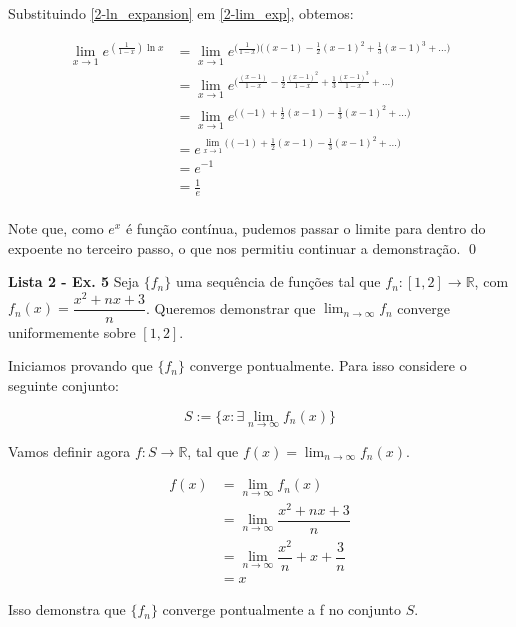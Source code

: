 \documentclass[12.5pt,reqno,a4paper]{amsart}
\begin{document}
\newpage
Substituindo \eqref{2-ln_expansion} em \eqref{2-lim_exp}, obtemos:

\begin{align*}
    \lim_{x \to 1} e^{(\tfrac{1}{1 - x}) \ln{x}} &= \lim_{x \to 1} e^{\big(\tfrac{1}{1 - x}\big) \big((x-1) - \tfrac{1}{2}(x-1)^2 + \tfrac{1}{3}(x-1)^3 + ...\big)}\\
        &= \lim_{x \to 1} e^{\big(\tfrac{(x-1)}{1-x} - \tfrac{1}{2}\tfrac{(x-1)^2}{1-x} + \tfrac{1}{3}\tfrac{(x-1)^3}{1-x} + ...\big)}\\
        &= \lim_{x \to 1} e^{\big((-1) + \tfrac{1}{2}(x-1) - \tfrac{1}{3}(x-1)^2 + ...\big)}\\
        &= e^{\lim_{x \to 1}{\big((-1) + \tfrac{1}{2}(x-1) - \tfrac{1}{3}(x-1)^2 + ...\big)}}\\
        &= e^{-1}\\
        &= \frac{1}{e}\\
\end{align*}

\bigskip
Note que, como $e^x$ é função contínua, pudemos passar o limite para dentro do expoente no terceiro passo, o que nos permitiu continuar a demonstração.
\qed\null

\newpage
\textbf{Lista 2 - Ex. 5}
\medbreak
Seja $\{f_n\}$ uma sequência de funções tal que $f_n: [1,2] \to \mathbb{R}$, com $f_n(x) = \dfrac{x^2 + nx + 3}{n}$. Queremos demonstrar que $\lim_{n \to \infty} f_n$ converge uniformemente sobre $[1,2]$.

\bigskip
Iniciamos provando que $\{f_n\}$ converge pontualmente. Para isso considere o seguinte conjunto:

\begin{equation*}
S := \{x : \exists \lim_{n \to \infty} f_n(x)\}    
\end{equation*}

\bigskip
Vamos definir agora $f: S \to \mathbb{R}$, tal que $f(x) = \lim_{n \to \infty} f_n(x)$.

\begin{align*}
    f(x) &= \lim_{n \to \infty} f_n(x)\\
         &= \lim_{n \to \infty} \dfrac{x^2 + nx + 3}{n}\\
         &= \lim_{n \to \infty} \dfrac{x^2}{n} + x + \dfrac{3}{n}\\
         &= x
\end{align*}

\bigskip
Isso demonstra que $\{f_n\}$ converge pontualmente a f no conjunto $S$.
\end{document}
